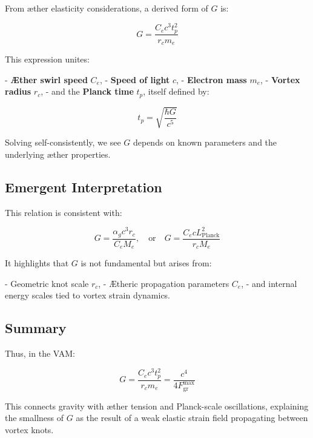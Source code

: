 From æther elasticity considerations, a derived form of \( G \) is:

\begin{equation}
    G = \frac{C_e c^3 t_p^2}{r_c m_e}
\end{equation}

This expression unites:

- \textbf{Æther swirl speed} \( C_e \),
- \textbf{Speed of light} \( c \),
- \textbf{Electron mass} \( m_e \),
- \textbf{Vortex radius} \( r_c \),
- and the \textbf{Planck time} \( t_p \), itself defined by:

\[
    t_p = \sqrt{\frac{\hbar G}{c^5}}
\]

Solving self-consistently, we see \( G \) depends on known parameters and the underlying æther properties.

\subsection*{Emergent Interpretation}

This relation is consistent with:

\[
    G = \frac{\alpha_g c^3 r_c}{C_e M_e}, \quad \text{or} \quad G = \frac{C_e c L_{\text{Planck}}^2}{r_c M_e}
\]

It highlights that \( G \) is not fundamental but arises from:

- Geometric knot scale \( r_c \),
- Ætheric propagation parameters \( C_e \),
- and internal energy scales tied to vortex strain dynamics.

\subsection*{Summary}

Thus, in the VAM:

\begin{equation}
    \boxed{G = \frac{C_e c^3 t_p^2}{r_c m_e} = \frac{c^4}{4 F^{\text{max}}_{\text{gr}}}}
\end{equation}

This connects gravity with æther tension and Planck-scale oscillations, explaining the smallness of \( G \) as the result of a weak elastic strain field propagating between vortex knots.


